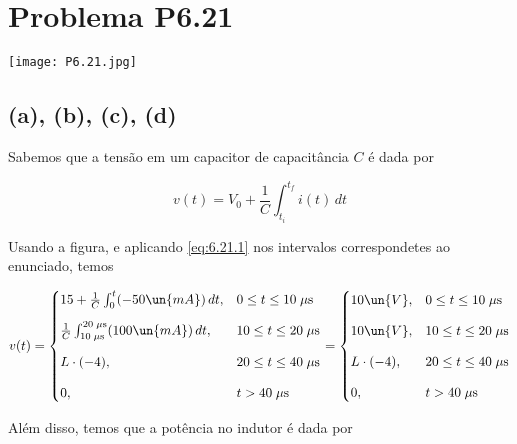 
\section*{Problema P6.21}

\renewcommand*\thesection{6.21}

\begin{center}
    \texttt{[image: P6.21.jpg]}
\end{center}

\subsection*{(a), (b), (c), (d)}


Sabemos que a tensão em um capacitor de capacitância $C$ é dada por

\begin{equation}\label{eq:6.21.1}
    v(t) = V_0 + \frac{1}{C} \int_{t_i}^{t_f} i(t) \,dt
\end{equation}

Usando a figura, e aplicando \eqref{eq:6.21.1} nos intervalos correspondetes ao enunciado, temos

\[ v(t) =
    \begin{cases}
        15 + \frac{1}{C} \int_{0}^{t} (-50 \un{mA}) \,dt,            & 0 \leq t \leq 10 \;\mu\textrm{s}  \\
        \noalign{\vskip9pt}
        \frac{1}{C} \int_{10 \;\mu\textrm{s}}^{20 \;\mu\textrm{s}} (100 \un{mA}) \,dt,    & 10 \leq t \leq 20 \;\mu\textrm{s} \\
        \noalign{\vskip9pt}
        L \cdot (-4), & 20 \leq t \leq 40 \;\mu\textrm{s} \\
        \noalign{\vskip9pt}
        0,            & t > 40 \;\mu\textrm{s}
    \end{cases}
    =
    \begin{cases}
        10 \un{V},            & 0 \leq t \leq 10 \;\mu\textrm{s}  \\
        \noalign{\vskip9pt}
        10 \un{V},    & 10 \leq t \leq 20 \;\mu\textrm{s} \\
        \noalign{\vskip9pt}
        L \cdot (-4), & 20 \leq t \leq 40 \;\mu\textrm{s} \\
        \noalign{\vskip9pt}
        0,            & t > 40 \;\mu\textrm{s}
    \end{cases}
\]

Além disso, temos que a potência no indutor é dada por





